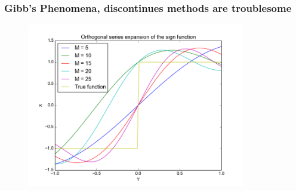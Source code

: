 \documentclass{beamer}
\begin{document}
\begin{frame}
  \frametitle{Gibb's Phenomena, discontinues methods are troublesome}
  \begin{figure}
  \includegraphics[width=0.85\textwidth]{gibbs.png}
  \end{figure}
  \end{frame}


  
\end{document}
